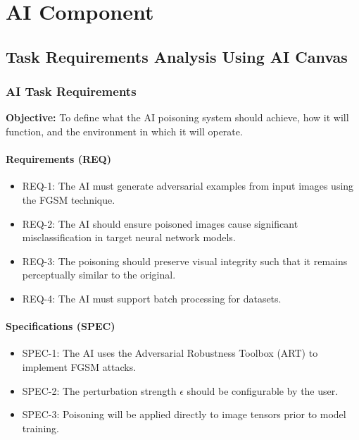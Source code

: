 \chapter{AI Component}
\label{chap:ai-component}


\section{Task Requirements Analysis Using AI Canvas}
\label{section:Task-Requirements-Analysis-Using-AI-Canvas}
\subsection{AI Task Requirements}

\textbf{Objective:}  
To define what the AI poisoning system should achieve, how it will function, and the environment in which it will operate.

\subsubsection*{Requirements (REQ)}
\begin{itemize}
    \item REQ-1: The AI must generate adversarial examples from input images using the FGSM technique.
    \item REQ-2: The AI should ensure poisoned images cause significant misclassification in target neural network models.
    \item REQ-3: The poisoning should preserve visual integrity such that it remains perceptually similar to the original.
    \item REQ-4: The AI must support batch processing for datasets.
\end{itemize}

\subsubsection*{Specifications (SPEC)}
\begin{itemize}
    \item SPEC-1: The AI uses the Adversarial Robustness Toolbox (ART) to implement FGSM attacks.
    \item SPEC-2: The perturbation strength $\epsilon$ should be configurable by the user.
    \item SPEC-3: Poisoning will be applied directly to image tensors prior to model training.
\end{itemize}

